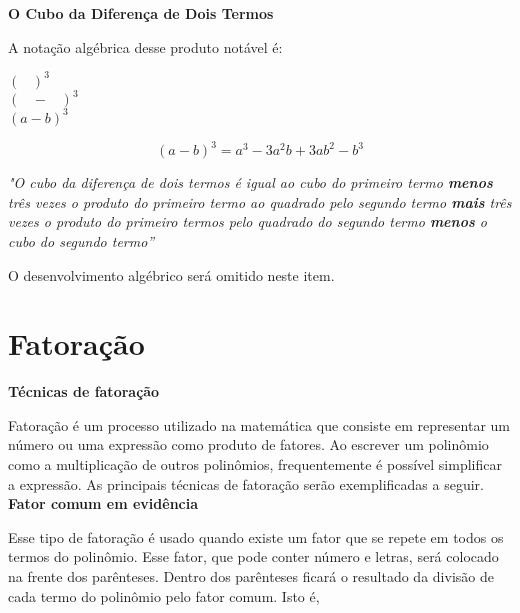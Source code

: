     \noindent
	\textbf{O Cubo da Diferença de Dois Termos}
	
	A notação algébrica desse produto notável é:

        \begin{tcolorbox}[colback=white,colframe=minha_cor,coltitle=black,title=O Cubo da Diferença de Dois Termos] 
        \centering
         $( \;\;\;)^3$ \\[0.25cm]
         $(\;\;\;-\;\;\;)^3$ \\[0.25cm]
         $( a - b )^3$
        \end{tcolorbox}
	
	\[
	( a - b )^3 = a^3 - 3 a^2 b + 3 a b^2 - b^3 
	\]
	
	\textit{"O cubo da diferença de dois termos é igual ao cubo do primeiro termo \textbf{menos} três vezes o produto do primeiro termo ao quadrado pelo segundo termo \textbf{mais} três vezes o produto do primeiro termos pelo quadrado do segundo termo \textbf{menos} o cubo do segundo termo''}
	
	O desenvolvimento algébrico será omitido neste item.

        \begin{texample}
        \centering
        \end{texample}
        
	\section{Fatoração}

    \noindent
	\textbf{Técnicas de fatoração}
	
	Fatoração é um processo utilizado na matemática que consiste em representar um número ou uma expressão como produto de fatores. Ao escrever um polinômio como a multiplicação de outros polinômios, frequentemente é possível simplificar a expressão. As principais técnicas de fatoração serão exemplificadas a seguir.\\

    \noindent
	\textbf{Fator comum em evidência}
	
	Esse tipo de fatoração é usado quando existe um fator que se repete em todos os termos do polinômio. Esse fator, que pode conter número e letras, será colocado na frente dos parênteses. Dentro dos parênteses ficará o resultado da divisão de cada termo do polinômio pelo fator comum. Isto é,
	
